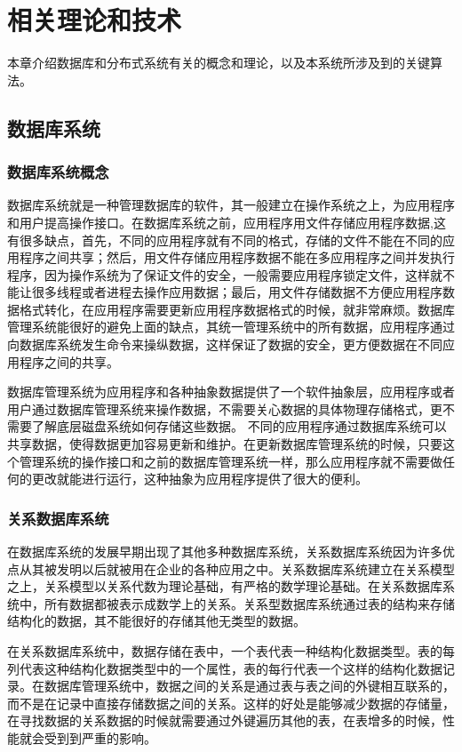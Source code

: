 
\chapter{相关理论和技术}
本章介绍数据库和分布式系统有关的概念和理论，以及本系统所涉及到的关键算法。
\section{数据库系统}
\subsection{数据库系统概念}
数据库系统就是一种管理数据库的软件，其一般建立在操作系统之上，为应用程序和用户提高操作接口。在数据库系统之前，应用程序用文件存储应用程序数据,这有很多缺点，首先，不同的应用程序就有不同的格式，存储的文件不能在不同的应用程序之间共享；然后，用文件存储应用程序数据不能在多应用程序之间并发执行程序，因为操作系统为了保证文件的安全，一般需要应用程序锁定文件，这样就不能让很多线程或者进程去操作应用数据；最后，用文件存储数据不方便应用程序数据格式转化，在应用程序需要更新应用程序数据格式的时候，就非常麻烦。数据库管理系统能很好的避免上面的缺点，其统一管理系统中的所有数据，应用程序通过向数据库系统发生命令来操纵数据，这样保证了数据的安全，更方便数据在不同应用程序之间的共享。

数据库管理系统为应用程序和各种抽象数据提供了一个软件抽象层，应用程序或者用户通过数据库管理系统来操作数据，不需要关心数据的具体物理存储格式，更不需要了解底层磁盘系统如何存储这些数据。
不同的应用程序通过数据库系统可以共享数据，使得数据更加容易更新和维护。在更新数据库管理系统的时候，只要这个管理系统的操作接口和之前的数据库管理系统一样，那么应用程序就不需要做任何的更改就能进行运行，这种抽象为应用程序提供了很大的便利。
\subsection{关系数据库系统}
在数据库系统的发展早期出现了其他多种数据库系统，关系数据库系统因为许多优点从其被发明以后就被用在企业的各种应用之中。关系数据库系统建立在关系模型之上，关系模型以关系代数为理论基础，有严格的数学理论基础。在关系数据库系统中，所有数据都被表示成数学上的关系。关系型数据库系统通过表的结构来存储结构化的数据，其不能很好的存储其他无类型的数据。

在关系数据库系统中，数据存储在表中，一个表代表一种结构化数据类型。表的每列代表这种结构化数据类型中的一个属性，表的每行代表一个这样的结构化数据记录。在数据库管理系统中，数据之间的关系是通过表与表之间的外键相互联系的，而不是在记录中直接存储数据之间的关系。这样的好处是能够减少数据的存储量，在寻找数据的关系数据的时候就需要通过外键遍历其他的表，在表增多的时候，性能就会受到到严重的影响。

